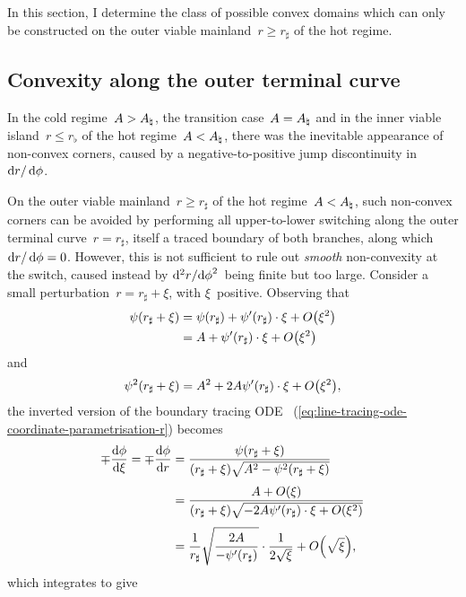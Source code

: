 In this section,
I determine the class of possible convex domains
which can only be constructed
on the outer viable mainland~$r \ge r_\sharp$
of the hot regime.

\subsection{Convexity along the outer terminal curve}
\label{sec:line.convex.terminal}

In the cold regime~$A > A_\natural$, the transition case~$A = A_\natural$
and in the inner viable island~$r \le r_\flat$
of the hot regime~$A < A_\natural$,
there was the inevitable appearance of non-convex corners,
caused by a negative-to-positive jump discontinuity in~$\mathop{}\!\mathrm{d} r / \mathop{}\!\mathrm{d}\phi$.

On the outer viable mainland~$r \ge r_\sharp$
of the hot regime~$A < A_\natural$,
such non-convex corners can be avoided
by performing all upper-to-lower switching
along the outer terminal curve~$r = r_\sharp$,
itself a traced boundary of both branches,
along which~$\mathop{}\!\mathrm{d} r / \mathop{}\!\mathrm{d}\phi = 0$.
However, this is not sufficient to rule out
\emph{smooth} non-convexity at the switch,
caused instead by $\mathop{}\!\mathrm{d}^2 r / {\mathop{}\!\mathrm{d}\phi}^2$~being finite but too large.
Consider a small perturbation~$r = r_\sharp + \xi$,
with $\xi$~positive.
Observing that
\begin{align*}
  \psi (r_\sharp + \xi)
  &=
    \psi (r_\sharp) + \psi' (r_\sharp) \cdot \xi
    + \order \roundbr*{\xi^2}
      \\
  &=
    A + \psi' (r_\sharp) \cdot \xi
    + \order \roundbr*{\xi^2}
\end{align*}
and
\[
  \psi^2 (r_\sharp + \xi) =
  A^2 + 2 A \psi' (r_\sharp) \cdot \xi + \order \roundbr*{\xi^2},
\]
the inverted version of the boundary tracing ODE~%
  (\ref{eq:line-tracing-ode-coordinate-parametrisation-r})
becomes
\begin{align*}
  \mp \tder{\phi}{\xi} = \mp \tder{\phi}{r}
  &=
    \frac{
      \psi (r_\sharp + \xi)
    }{
      (r_\sharp + \xi) \sqrt{A^2 - \psi^2 (r_\sharp + \xi)}
    }
    \\[\fraclinespace]
  &=
    \frac{
      A + \order (\xi)
    }{
      (r_\sharp + \xi)
      \sqrt{-2 A \psi' (r_\sharp) \cdot \xi + \order \roundbr*{\xi^2}}
    }
    \\[\fraclinespace]
  &=
    \frac{1}{r_\sharp}
    \sqrt{\frac{2 A}{-\psi' (r_\sharp)}}
      \cdot
    \frac{1}{2 \sqrt{\xi}}
    + \order \roundbr*{\sqrt{\xi}},
\end{align*}
which integrates to give
